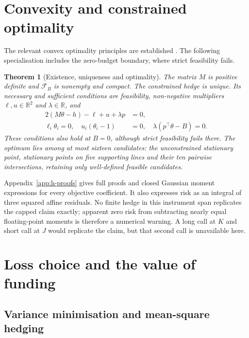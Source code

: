 \documentclass[11pt]{article}
\newtheorem{theorem}{Theorem}[section]
\begin{document}
\section{Convexity and constrained optimality}

The relevant convex optimality principles are established
\citep{boydvandenberghe2004}. The following specialisation includes the
zero-budget boundary, where strict feasibility fails.

\begin{theorem}[Existence, uniqueness and optimality]
\label{thm:h-constrained-optimum}
The matrix $M$ is positive definite and $\mathcal F_B$ is nonempty
and compact. The constrained hedge is unique. Its necessary and
sufficient conditions are feasibility, non-negative multipliers
$\ell,u\in\mathbb R^2$ and $\lambda\in\mathbb R$, and
\begin{align}
 2(M\theta-h)-\ell+u+\lambda p&=0,\label{eq:h-kkt-stationarity}\\
 \ell_i\theta_i=0,\quad u_i(\theta_i-1)&=0,\quad
 \lambda(p^\top\theta-B)=0.\label{eq:h-kkt-complementarity}
\end{align}
These conditions also hold at $B=0$, although strict feasibility
fails there. The optimum lies among at most sixteen candidates:
the unconstrained stationary point, stationary points on five
supporting lines and their ten pairwise intersections, retaining
only well-defined feasible candidates.
\end{theorem}

Appendix~\ref{app:h-proofs} gives full proofs and closed Gaussian
moment expressions for every objective coefficient. It also expresses
risk as an integral of three squared affine residuals. No finite hedge
in this instrument span replicates the capped claim exactly; apparent
zero risk from subtracting nearly equal floating-point moments is
therefore a numerical warning. A long call at $K$ and short call at
$J$ would replicate the claim, but that second call is unavailable here.

\section{Loss choice and the value of funding}
\subsection{Variance minimisation and mean-square hedging}
\end{document}
